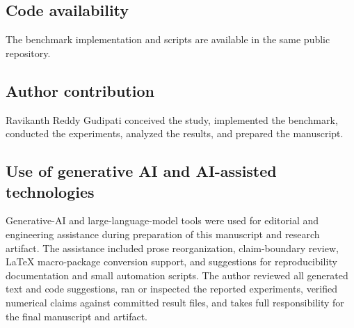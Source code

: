 \documentclass[twocolumn,runningheads]{svjour3}
\begin{document}
\subsection*{Code availability}
The benchmark implementation and scripts are available in the same public repository.

\subsection*{Author contribution}
Ravikanth Reddy Gudipati conceived the study, implemented the benchmark, conducted the experiments, analyzed the results, and prepared the manuscript.

\subsection*{Use of generative AI and AI-assisted technologies}
Generative-AI and large-language-model tools were used for editorial and engineering assistance during preparation of this manuscript and research artifact. The assistance included prose reorganization, claim-boundary review, LaTeX macro-package conversion support, and suggestions for reproducibility documentation and small automation scripts. The author reviewed all generated text and code suggestions, ran or inspected the reported experiments, verified numerical claims against committed result files, and takes full responsibility for the final manuscript and artifact.
\end{document}

